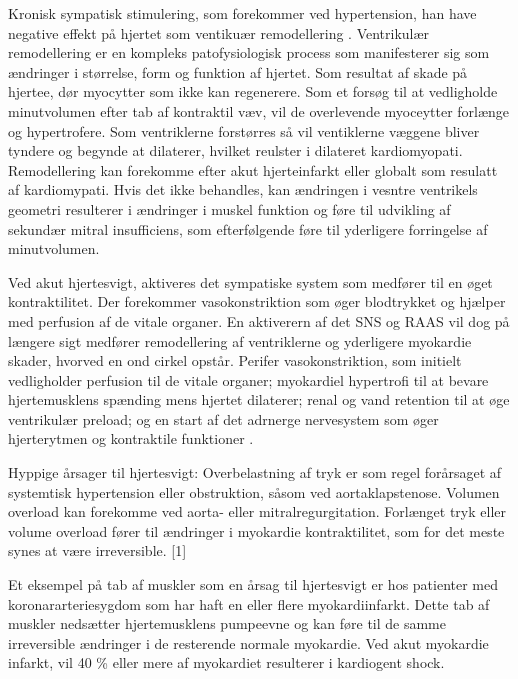 Kronisk sympatisk stimulering, som forekommer ved hypertension, han have negative effekt på hjertet som ventikuær remodellering \citep{Connolly2000}. 
Ventrikulær remodellering er en kompleks patofysiologisk process som manifesterer sig som ændringer i størrelse, form og funktion af hjertet. Som resultat af skade på hjertee, dør myocytter som ikke kan regenerere. Som et forsøg til at vedligholde minutvolumen efter tab af kontraktil væv, vil de overlevende myoceytter forlænge og hypertrofere. Som ventriklerne forstørres så vil ventiklerne væggene bliver tyndere og begynde at dilaterer, hvilket reulster i dilateret kardiomyopati. \citep{Cohn2000} Remodellering kan forekomme efter akut hjerteinfarkt eller globalt som resulatt af kardiomypati. Hvis det ikke behandles, kan ændringen i vesntre ventrikels geometri resulterer i ændringer i muskel funktion og føre til udvikling af sekundær mitral insufficiens, som efterfølgende føre til yderligere forringelse af minutvolumen. \citep{Gheorghiade1998}

Ved akut hjertesvigt, aktiveres det sympatiske system som medfører til en øget kontraktilitet. Der forekommer vasokonstriktion som øger blodtrykket og hjælper med perfusion af de vitale organer. En aktiverern af det SNS og RAAS vil dog på længere sigt medfører remodellering af ventriklerne og yderligere myokardie skader, hvorved en ond cirkel opstår. \citep{Braunwald2013}
Perifer vasokonstriktion, som initielt vedligholder perfusion til de vitale organer; myokardiel hypertrofi til at bevare hjertemusklens spænding mens hjertet dilaterer; renal og vand retention til at øge ventrikulær preload; og en start af det adrnerge nervesystem som øger hjerterytmen og kontraktile funktioner \citep{Rundqvist1997}. 

Hyppige årsager til hjertesvigt:
Overbelastning af tryk er som regel forårsaget af systemtisk hypertension eller obstruktion, såsom ved aortaklapstenose. Volumen overload kan forekomme ved aorta- eller mitralregurgitation.  Forlænget tryk eller volume overload fører til ændringer i myokardie kontraktilitet, som for det meste synes at være irreversible. [1]

Et eksempel på tab af muskler som en årsag til hjertesvigt er hos patienter med koronararteriesygdom som har haft en eller flere myokardiinfarkt. Dette tab af muskler nedsætter hjertemusklens pumpeevne og kan føre til de samme irreversible ændringer i de resterende normale myokardie. Ved akut myokardie infarkt, vil 40 \% eller mere af myokardiet resulterer i kardiogent shock. \citep{Page1971}

